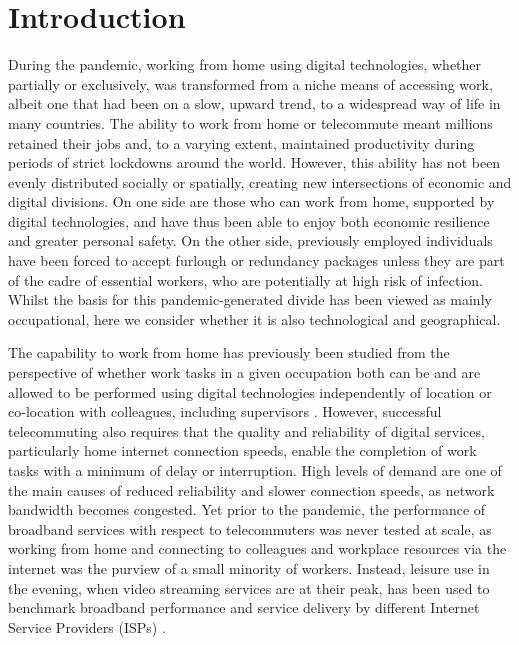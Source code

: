 \documentclass[]{interact}
\theoremstyle{plain}%
\theoremstyle{definition}
\theoremstyle{remark}
\begin{document}
\hypertarget{sec:1}{%
\section{Introduction}\label{sec:1}}

During the pandemic, working from home using digital technologies,
whether partially or exclusively, was transformed from a niche means of
accessing work, albeit one that had been on a slow, upward trend, to a
widespread way of life in many countries. The ability to work from home
or telecommute meant millions retained their jobs and, to a varying
extent, maintained productivity during periods of strict lockdowns
around the world. However, this ability has not been evenly distributed
socially or spatially, creating new intersections of economic and
digital divisions. On one side are those who can work from home,
supported by digital technologies, and have thus been able to enjoy both
economic resilience and greater personal safety. On the other side,
previously employed individuals have been forced to accept furlough or
redundancy packages unless they are part of the cadre of essential
workers, who are potentially at high risk of infection. Whilst the basis
for this pandemic-generated divide has been viewed as mainly
occupational, here we consider whether it is also technological and
geographical.

The capability to work from home has previously been studied from the
perspective of whether work tasks in a given occupation both can be and
are allowed to be performed using digital technologies independently of
location or co-location with colleagues, including supervisors
\citep{allen2015effective, singh2013modeling}. However, successful
telecommuting also requires that the quality and reliability of digital
services, particularly home internet connection speeds, enable the
completion of work tasks with a minimum of delay or interruption. High
levels of demand are one of the main causes of reduced reliability and
slower connection speeds, as network bandwidth becomes congested. Yet
prior to the pandemic, the performance of broadband services with
respect to telecommuters was never tested at scale, as working from home
and connecting to colleagues and workplace resources via the internet
was the purview of a small minority of workers. Instead, leisure use in
the evening, when video streaming services are at their peak, has been
used to benchmark broadband performance and service delivery by
different Internet Service Providers (ISPs) \citep{ofcom2017}.
\end{document}
